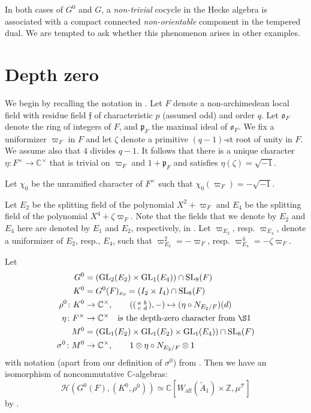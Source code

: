 \documentclass[11pt]{amsart}
\theoremstyle{remark}
\theoremstyle{definition}
\def\fo{\mathfrak{o}}
\newcommand{\Z}{\mathbb{Z}}
\newcommand{\C}{\mathbb{C}}
\newcommand{\SL}{\mathrm{SL}}
\newcommand{\GL}{\mathrm{GL}}
\def\fp{\mathfrak{p}}
\begin{document}
In both cases of $G^0$ and $G$, a \emph{non-trivial} cocycle in the Hecke algebra is associated with a compact connected \emph{non-orientable} component in the tempered dual.   
We are tempted to ask whether this phenomenon arises in other examples.   



 
\section{Depth zero}  We begin by recalling the notation in \cite{AFO}.    Let $F$ denote a non-archimedean local field with residue field $\mathfrak{f}$  of characteristic $p$   
(assumed odd) and order $q$.  Let $\fo_F$  denote the ring of  integers of $F$, and $\fp_F$ the maximal ideal of $\fo_F$.  We fix a uniformizer $\varpi_F$ in $F$ and let $\zeta$  denote a primitive $(q-1)$-st root of unity in $F$.   
 We assume also that $4$ divides $q-1$.   It follows that there is a unique character $\eta \colon F^\times \to \C^\times$ that is trivial on $\varpi_F$ and $1 + \fp_F$ and satisfies $\eta(\zeta) = \sqrt{-1}$.   
 
 Let $\chi_0$ be the unramified character of $F^\times$ such that $\chi_0(\varpi_F ) = - \sqrt{-1}$.   
 
 Let $E_2$ be the splitting field of the polynomial $X^2 + \varpi_F$ 
 and  $E_4$ be the splitting field of the polynomial $X^4 + \zeta \varpi_F$.   Note that the
fields that we denote by $E_2$  and $E_4$  here are denoted by $E_1$ and $E_2$, respectively,
in \cite{R}. Let $\varpi_{E_2}$, resp. $\varpi_{E_4}$, denote a uniformizer of $E_2$, resp., $E_4$, such that
$\varpi^2_{E_2} = - \varpi_F$, resp. $\varpi^4_{E_4} = - \zeta \varpi_F$.   

Let
\begin{align*}
G^0 &= (\GL_2(E_2) \times \GL_1(E_4)) \cap \SL_8(F)\\
K^0 & = G^0(F)_{x_0} =  ( I_2  \times I_4) \cap \SL_8(F)\\
\rho^0\colon K^0 & \to  \C^\times, \quad \quad ((\begin{smallmatrix}
a&b\\
c & d
\end{smallmatrix}),-) \mapsto ( \eta \circ N_{E_2/F})(d)\\
\eta \colon F^\times & \to  \C^\times  \quad  \textrm{is the depth-zero character from \S1}\\
M^0 &= (\GL_1(E_2) \times \GL_1(E_2) \times \GL_1(E_4)) \cap \SL_8(F)\\
\sigma^0\colon M^0 & \to  \C^\times, \quad \quad 1 \otimes \eta \circ N_{E_2/F} \otimes 1 
\end{align*}
with notation (apart from our definition of $\sigma^0$) from \cite{AFO}.   Then we have an isomorphism of noncommutative $\C$-algebras:
\[
\boxed{
\mathcal{H}(G^0(F), (K^0, \rho^0)) \simeq  \C[W_{\mathrm{aff}}(\widetilde{A}_1) \times \Z, \mu^\mathcal{T}]
}
\]
by \cite[Prop. 3.4 and  Corollary 3.9]{AFO}.  
\end{document}
